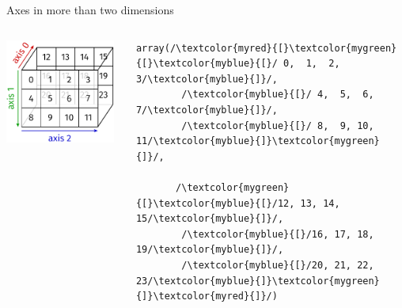 \documentclass[svgnames]{beamer}
\begin{document}
\begin{frame}[fragile]{Axes in more than two dimensions}
 \begin{columns}
  \begin{column}{0.4\textwidth}
   \begin{center}
   \includegraphics[width=0.95\textwidth]{array3d}
   \end{center}
  \end{column}%
  \begin{column}{0.6\textwidth}
   \begin{lstlisting}
array(/\textcolor{myred}{[}\textcolor{mygreen}{[}\textcolor{myblue}{[}/ 0,  1,  2,  3/\textcolor{myblue}{]}/,
        /\textcolor{myblue}{[}/ 4,  5,  6,  7/\textcolor{myblue}{]}/,
        /\textcolor{myblue}{[}/ 8,  9, 10, 11/\textcolor{myblue}{]}\textcolor{mygreen}{]}/,

       /\textcolor{mygreen}{[}\textcolor{myblue}{[}/12, 13, 14, 15/\textcolor{myblue}{]}/,
        /\textcolor{myblue}{[}/16, 17, 18, 19/\textcolor{myblue}{]}/,
        /\textcolor{myblue}{[}/20, 21, 22, 23/\textcolor{myblue}{]}\textcolor{mygreen}{]}\textcolor{myred}{]}/)
    \end{lstlisting}%
  \end{column}
 \end{columns}


\end{frame}
\end{document}
